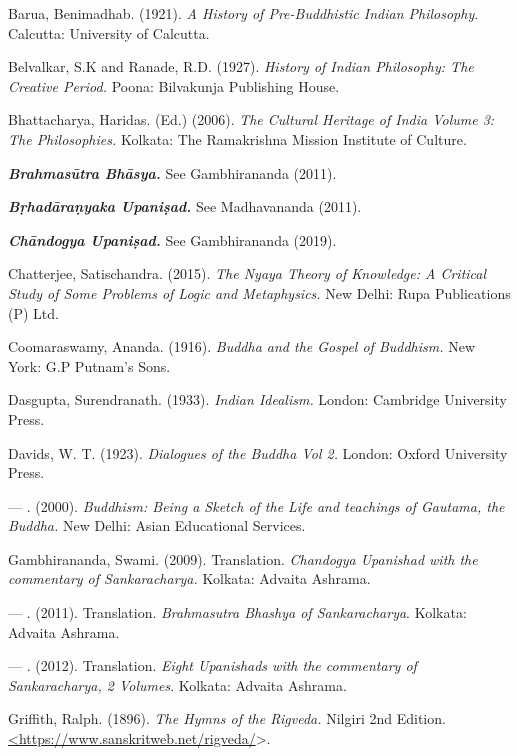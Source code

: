 \begin{thebibliography}{99}
\itemsep=1pt
 Barua, Benimadhab. (1921).\textit{ A History of Pre-Buddhistic Indian Philosophy}. Calcutta: University of Calcutta.

  Belvalkar, S.K and Ranade, R.D. (1927). \textit{History of Indian Philosophy: The Creative Period.} Poona: Bilvakunja Publishing House.

  Bhattacharya, Haridas. (Ed.) (2006). \textit{The Cultural Heritage of India Volume 3: The Philosophies.} Kolkata: The Ramakrishna Mission Institute of Culture.
 
  \textbf{\textit{Brahmasūtra Bhāsya.}} See Gambhirananda (2011).
 
  \textbf{\textit{Bṛhadāraṇyaka Upaniṣad.}} See Madhavananda (2011).
 
  \textbf{\textit{Chāndogya Upaniṣad.}} See Gambhirananda (2019).

  Chatterjee, Satischandra. (2015). \textit{The Nyaya Theory of Knowledge: A Critical Study of Some Problems of Logic and Metaphysics.} New Delhi: Rupa Publications (P) Ltd.

  Coomaraswamy, Ananda. (1916). \textit{Buddha and the Gospel of Buddhism.} New York: G.P Putnam’s Sons.

  Dasgupta, Surendranath. (1933).\textit{ Indian Idealism.} London: Cambridge University Press.

  Davids, W. T. (1923). \textit{Dialogues of the Buddha Vol 2.} London: Oxford University Press.

  — . (2000). \textit{Buddhism: Being a Sketch of the Life and teachings of Gautama, the Buddha.} New Delhi: Asian Educational Services.

  Gambhirananda, Swami. (2009). Translation. \textit{Chandogya Upanishad with the commentary of Sankaracharya.} Kolkata: Advaita Ashrama.

  — . (2011). Translation. \textit{Brahmasutra Bhashya of Sankaracharya}. Kolkata: Advaita Ashrama.

  — . (2012). Translation. \textit{Eight Upanishads with the commentary of Sankaracharya, 2 Volumes}. Kolkata: Advaita Ashrama.

  Griffith, Ralph. (1896). \textit{The Hymns of the Rigveda.} Nilgiri 2nd Edition. \url{<https://www.sanskritweb.net/rigveda/}\textgreater .


\end{thebibliography}
